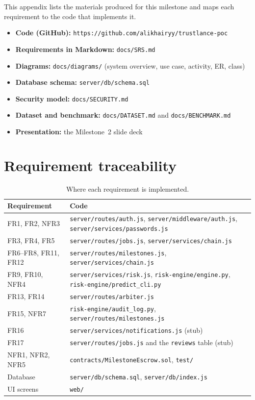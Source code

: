 This appendix lists the materials produced for this milestone and maps each requirement to the code that implements it.

\begin{itemize}
\item \textbf{Code (GitHub):} \texttt{https://github.com/alikhairyy/trustlance-poc}
\item \textbf{Requirements in Markdown:} \texttt{docs/SRS.md}
\item \textbf{Diagrams:} \texttt{docs/diagrams/} (system overview, use case, activity, ER, class)
\item \textbf{Database schema:} \texttt{server/db/schema.sql}
\item \textbf{Security model:} \texttt{docs/SECURITY.md}
\item \textbf{Dataset and benchmark:} \texttt{docs/DATASET.md} and \texttt{docs/BENCHMARK.md}
\item \textbf{Presentation:} the Milestone~2 slide deck
\end{itemize}

\section{Requirement traceability}
\label{sec:trace}
\begin{table}[htbp]
\centering
\small
\begin{tabularx}{\textwidth}{>{\raggedright\arraybackslash}p{3.4cm}L}
\hline
\textbf{Requirement} & \textbf{Code} \\ \hline
FR1, FR2, NFR3 & \texttt{server/routes/auth.js}, \texttt{server/middleware/auth.js}, \texttt{server/services/passwords.js} \\
FR3, FR4, FR5 & \texttt{server/routes/jobs.js}, \texttt{server/services/chain.js} \\
FR6--FR8, FR11, FR12 & \texttt{server/routes/milestones.js}, \texttt{server/services/chain.js} \\
FR9, FR10, NFR4 & \texttt{server/services/risk.js}, \texttt{risk-engine/engine.py}, \texttt{risk-engine/predict\_cli.py} \\
FR13, FR14 & \texttt{server/routes/arbiter.js} \\
FR15, NFR7 & \texttt{risk-engine/audit\_log.py}, \texttt{server/routes/milestones.js} \\
FR16 & \texttt{server/services/notifications.js} (stub) \\
FR17 & \texttt{server/routes/jobs.js} and the \texttt{reviews} table (stub) \\
NFR1, NFR2, NFR5 & \texttt{contracts/MilestoneEscrow.sol}, \texttt{test/} \\
Database & \texttt{server/db/schema.sql}, \texttt{server/db/index.js} \\
UI screens & \texttt{web/} \\ \hline
\end{tabularx}
\caption{Where each requirement is implemented.}
\label{tab:trace}
\end{table}

